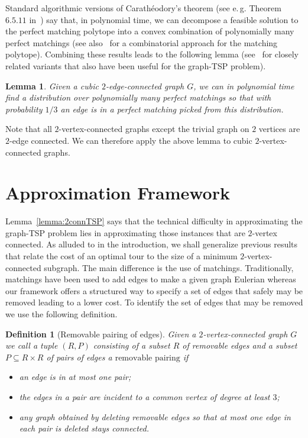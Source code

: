 \documentclass[letterpaper,11pt]{article}
\newtheorem{lemma}[theorem]{Lemma}
\newtheorem{definition}[theorem]{Definition}
\newcommand{\MS}{\ensuremath{\mbox{removable pairing}}\xspace}
\newcommand{\TSP}{graph-TSP\xspace}
\begin{document}
    Standard algorithmic versions of Carath\'{e}odory's theorem (see
    e.\,g. Theorem~$6.5.11$ in~\cite{GLS1988}) say that, in polynomial time, we can
    decompose a feasible solution to the perfect matching polytope into a
    convex combination of polynomially many perfect matchings (see
    also~\cite{Barahona04} for a combinatorial approach for the matching
    polytope).
    Combining these results leads to the following lemma (see~\cite{BSSS11,GLS05,MMP90} for
    closely related variants that also have  been useful for the
    \TSP problem).
    \begin{lemma}
    \label{lem:matching}
      Given a cubic $2$-edge-connected graph $G$, we can in polynomial time
      find a distribution over polynomially many perfect matchings so that
      with probability $1/3$ an edge is in a  perfect matching picked from this distribution.
    \end{lemma}
    Note that all $2$-vertex-connected graphs except the trivial graph on
    $2$ vertices are $2$-edge connected. We can therefore apply the above
    lemma to cubic $2$-vertex-connected graphs.

    \vspace{-0.2cm}
\section{Approximation  Framework}
\label{sec:tspframework}
Lemma~\ref{lemma:2connTSP} says that the technical difficulty in
approximating the \TSP problem lies in approximating those instances
that are $2$-vertex connected.
As alluded to in the introduction, we shall generalize previous
results~\cite{FJJ89,MMP90} that relate the cost of an optimal tour to
the size of a minimum $2$-vertex-connected subgraph. The main
difference is the use of matchings. Traditionally, matchings have been
used to add edges to make a given graph Eulerian whereas our framework
offers a structured way to specify a set of edges that safely may be
removed leading to a lower cost. To identify the set of edges that may
be removed we use the following definition.

\vspace{-0.1cm}
\begin{definition}[Removable pairing of edges] \label{def:pairing}
  Given a $2$-vertex-connected graph $G$ we call a tuple $(R,P)$ consisting of a  subset $R$ of removable edges and  a subset   $P\subseteq R\times R$ of pairs of edges a  \emph{\MS{}} if
\vspace{-0.2cm}
  \begin{itemize}\itemsep-1mm
    \item an edge is in at most one pair;
    \item the edges in a pair are incident to a common vertex of degree at least $3$;
    \item any graph obtained by deleting removable edges so that at most one edge in each pair is deleted stays connected.
  \end{itemize}
\end{definition}
\end{document}
